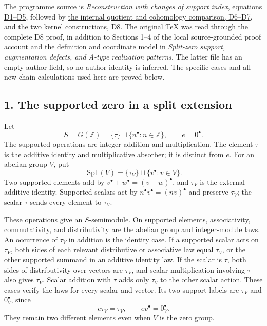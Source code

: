 \documentclass[
]{article}
\begin{document}
The programme source is
\href{https://github.com/KokunoYumeto/zeta-function-research-reader/blob/39ced92952a9c807d51500783b221beb141da3b6/workbenches/splitzero-tandem/tex/support_diagrams.tex\#L9}{\emph{Reconstruction
with changes of support index}, equations D1--D5}, followed by
\href{https://github.com/KokunoYumeto/zeta-function-research-reader/blob/39ced92952a9c807d51500783b221beb141da3b6/workbenches/splitzero-tandem/tex/support_diagrams.tex\#L125}{the
internal quotient and cohomology comparison, D6--D7}, and
\href{https://github.com/KokunoYumeto/zeta-function-research-reader/blob/39ced92952a9c807d51500783b221beb141da3b6/workbenches/splitzero-tandem/tex/support_diagrams.tex\#L178}{the
two kernel constructions, D8}. The original TeX was read through the
complete D8 proof, in addition to Sections 1--4 of the local
source-grounded proof account and the definition and coordinate model in
\emph{Split-zero support, augmentation defects, and A-type realization
patterns}. The latter file has an empty author field, so no author
identity is inferred. The specific cases and all new chain calculations
used here are proved below.

\subsection{1. The supported zero in a split
extension}\label{the-supported-zero-in-a-split-extension}

Let \[
S=G(\mathbb Z)=\{\tau\}\sqcup\{n^\bullet:n\in\mathbb Z\},
\qquad e=0^\bullet.
\tag{Q1}
\] The supported operations are integer addition and multiplication. The
element \(\tau\) is the additive identity and multiplicative absorber;
it is distinct from \(e\). For an abelian group \(V\), put \[
\operatorname{Spl}(V)=\{\tau_V\}\sqcup\{v^\bullet:v\in V\}.
\tag{Q2}
\] Two supported elements add by \(v^\bullet+w^\bullet=(v+w)^\bullet\),
and \(\tau_V\) is the external additive identity. Supported scalars act
by \(n^\bullet v^\bullet=(nv)^\bullet\) and preserve \(\tau_V\); the
scalar \(\tau\) sends every element to \(\tau_V\).

These operations give an \(S\)-semimodule. On supported elements,
associativity, commutativity, and distributivity are the abelian group
and integer-module laws. An occurrence of \(\tau_V\) in addition is the
identity case. If a supported scalar acts on \(\tau_V\), both sides of
each relevant distributive or associative law equal \(\tau_V\), or the
other supported summand in an additive identity law. If the scalar is
\(\tau\), both sides of distributivity over vectors are \(\tau_V\), and
scalar multiplication involving \(\tau\) also gives \(\tau_V\). Scalar
addition with \(\tau\) adds only \(\tau_V\) to the other scalar action.
These cases verify the laws for every scalar and vector. Its two support
labels are \(\tau_V\) and \(0_V^\bullet\), since \[
e\tau_V=\tau_V,\qquad ev^\bullet=0_V^\bullet.
\tag{Q3}
\] They remain two different elements even when \(V\) is the zero group.
\end{document}

